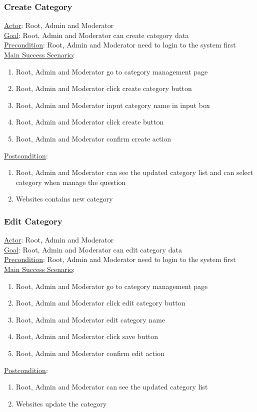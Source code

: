\documentclass[12pt,oneside,openright,a4paper]{cpe-english-project}
\begin{document}
	\subsubsection{Create Category}
	\underline{Actor}: Root, Admin and Moderator\\
	\underline{Goal}: Root, Admin and Moderator can create category data\\
	\underline{Precondition}: Root, Admin and Moderator need to login to the system first\\
	\underline{Main Success Scenario}:
	\begin{enumerate}[label={\arabic*.}]
		\item Root, Admin and Moderator go to category management page
		\item Root, Admin and Moderator click create category button
		\item Root, Admin and Moderator input category name in input box
		\item Root, Admin and Moderator click create button
		\item Root, Admin and Moderator confirm create action
	\end{enumerate}
	\underline{Postcondition}: 
	\begin{enumerate}[label={\arabic*.}]
		\item Root, Admin and Moderator can see the updated category list and can select category when manage the question
		\item Websites contains new category
	\end{enumerate}

	\subsubsection{Edit Category}
	\underline{Actor}: Root, Admin and Moderator\\
	\underline{Goal}: Root, Admin and Moderator can edit category data\\
	\underline{Precondition}: Root, Admin and Moderator need to login to the system first\\
	\underline{Main Success Scenario}:
	\begin{enumerate}[label={\arabic*.}]
		\item Root, Admin and Moderator go to category management page
		\item Root, Admin and Moderator click edit category button
		\item Root, Admin and Moderator edit category name
		\item Root, Admin and Moderator click save button
		\item Root, Admin and Moderator confirm edit action
	\end{enumerate}
	\underline{Postcondition}: 
	\begin{enumerate}[label={\arabic*.}]
		\item Root, Admin and Moderator can see the updated category list
		\item Websites update the category
	\end{enumerate}
\end{document}
